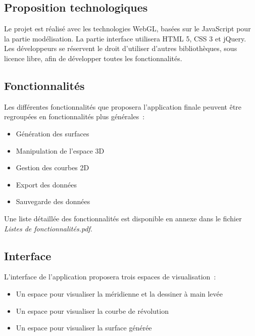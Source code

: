 \documentclass{scrartcl}
\begin{document}
	\subsection{Proposition technologiques}
		Le projet est réalisé avec les technologies WebGL, basées sur le JavaScript pour la partie modélisation.
		La partie interface utilisera HTML 5, CSS 3 et jQuery. 
		Les développeurs se réservent le droit d'utiliser d'autres bibliothèques, sous licence libre, afin de développer toutes les fonctionnalités.


	\subsection{Fonctionnalités}
		Les différentes fonctionnalités que proposera l'application finale peuvent être regroupées en fonctionnalités plus générales~:			
		
		\medskip %
		
		\begin{itemize}
			\item Génération des surfaces
			\item Manipulation de l'espace 3D
			\item Gestion des courbes 2D
			\item Export des données
			\item Sauvegarde des données
		\end{itemize}
	
		\bigskip %
		
		Une liste détaillée des fonctionnalités est disponible en annexe dans le fichier \emph{Listes de fonctionnalités.pdf}.

	\subsection{Interface}
		L'interface de l'application proposera trois espaces de visualisation~:
			
			\begin{itemize}
				\item Un espace pour visualiser la méridienne et la dessiner à main levée
				\item Un espace pour visualiser la courbe de révolution
				\item Un espace pour visualiser la surface générée
			\end{itemize}
			
\end{document}
